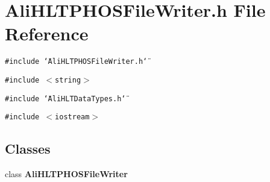 \section{Ali\-HLTPHOSFile\-Writer.h File Reference}
\label{AliHLTPHOSFileWriter_8h}


{\tt \#include \char`\"{}Ali\-HLTPHOSFile\-Writer.h\char`\"{}}\par
{\tt \#include $<$string$>$}\par
{\tt \#include \char`\"{}Ali\-HLTData\-Types.h\char`\"{}}\par
{\tt \#include $<$iostream$>$}\par
\subsection*{Classes}
\begin{CompactItemize}
\item 
class {\bf Ali\-HLTPHOSFile\-Writer}
\end{CompactItemize}
